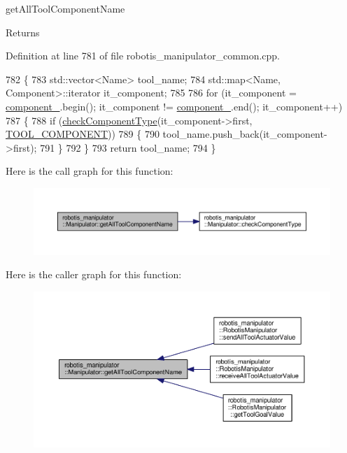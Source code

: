 get\+All\+Tool\+Component\+Name 

\begin{DoxyReturn}{Returns}

\end{DoxyReturn}


Definition at line 781 of file robotis\+\_\+manipulator\+\_\+common.\+cpp.


\begin{DoxyCode}
782 \{
783   std::vector<Name> tool\_name;
784   std::map<Name, Component>::iterator it\_component;
785 
786   \textcolor{keywordflow}{for} (it\_component = \hyperlink{classrobotis__manipulator_1_1_manipulator_a20b388b821f161972c2cf737fe1c26db}{component\_}.begin(); it\_component != \hyperlink{classrobotis__manipulator_1_1_manipulator_a20b388b821f161972c2cf737fe1c26db}{component\_}.end(); 
      it\_component++)
787   \{
788     \textcolor{keywordflow}{if} (\hyperlink{classrobotis__manipulator_1_1_manipulator_a5b1f27b9cc2875b4e0275e3b88ab1b28}{checkComponentType}(it\_component->first, \hyperlink{namespacerobotis__manipulator_a2bbf89d1c08dc1d9ff4e28beb939e382a7d53623544fe889894c54a988f503de0}{TOOL\_COMPONENT}))
789     \{
790       tool\_name.push\_back(it\_component->first);
791     \}
792   \}
793   \textcolor{keywordflow}{return} tool\_name;
794 \}
\end{DoxyCode}


Here is the call graph for this function\+:\nopagebreak
\begin{figure}[H]
\begin{center}
\leavevmode
\includegraphics[width=350pt]{classrobotis__manipulator_1_1_manipulator_a53cf6f3195057072869795ebac3b8dce_cgraph}
\end{center}
\end{figure}




Here is the caller graph for this function\+:\nopagebreak
\begin{figure}[H]
\begin{center}
\leavevmode
\includegraphics[width=350pt]{classrobotis__manipulator_1_1_manipulator_a53cf6f3195057072869795ebac3b8dce_icgraph}
\end{center}
\end{figure}


